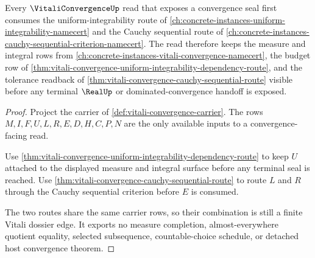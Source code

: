 \begin{proposition}
\label{prop:vitali-convergence-measure-cauchy-dependency-route}
Every $\VitaliConvergenceUp$ read that exposes a convergence seal first consumes the uniform-integrability route of \autoref{ch:concrete-instances-uniform-integrability-namecert} and the Cauchy sequential route of \autoref{ch:concrete-instances-cauchy-sequential-criterion-namecert}. The read therefore keeps the measure and integral rows from \autoref{ch:concrete-instances-vitali-convergence-namecert}, the budget row of \autoref{thm:vitali-convergence-uniform-integrability-dependency-route}, and the tolerance readback of \autoref{thm:vitali-convergence-cauchy-sequential-route} visible before any terminal $\RealUp$ or dominated-convergence handoff is exposed.
\end{proposition}
\begin{proof}
Project the carrier of \autoref{def:vitali-convergence-carrier}. The rows $M,I,F,U,L,R,E,D,H,C,P,N$ are the only available inputs to a convergence-facing read.

Use \autoref{thm:vitali-convergence-uniform-integrability-dependency-route} to keep $U$ attached to the displayed measure and integral surface before any terminal seal is reached. Use \autoref{thm:vitali-convergence-cauchy-sequential-route} to route $L$ and $R$ through the Cauchy sequential criterion before $E$ is consumed.

The two routes share the same carrier rows, so their combination is still a finite Vitali dossier edge. It exports no measure completion, almost-everywhere quotient equality, selected subsequence, countable-choice schedule, or detached host convergence theorem.
\end{proof}
